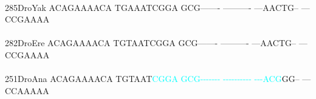 \documentclass[11pt,twoside,reqno,a4paper]{article}
\begin{document}
{\hspace*{4\charwidth}\hspace*{7\charwidth}\hspace*{1\charwidth}\hspace*{1\charwidth}\hspace*{1\charwidth}\hspace*{1\charwidth}\hspace*{1\charwidth}\hspace*{1\charwidth}\\
285\hspace*{1\charwidth}DroYak	ACAGAAAACA	TGAAATCGGA	GCG-------	----------	---AACTG--	---CCGAAAA	\\
\hspace*{4\charwidth}\hspace*{7\charwidth}\hspace*{1\charwidth}\hspace*{1\charwidth}\hspace*{1\charwidth}\hspace*{1\charwidth}\hspace*{1\charwidth}\hspace*{1\charwidth}\\
282\hspace*{1\charwidth}DroEre	ACAGAAAACA	TGTAATCGGA	GCG-------	----------	---AACTG--	---CCGAAAA	\\
\hspace*{4\charwidth}\hspace*{7\charwidth}\hspace*{1\charwidth}\hspace*{1\charwidth}\hspace*{1\charwidth}\hspace*{1\charwidth}\hspace*{1\charwidth}\hspace*{1\charwidth}\\
251\hspace*{1\charwidth}DroAna	ACAGAAAACA	TGTAAT\textcolor{cyan}{C}\textcolor{cyan}{G}\textcolor{cyan}{G}\textcolor{cyan}{A}	\textcolor{cyan}{G}\textcolor{cyan}{C}\textcolor{cyan}{G}\textcolor{cyan}{-}\textcolor{cyan}{-}\textcolor{cyan}{-}\textcolor{cyan}{-}\textcolor{cyan}{-}\textcolor{cyan}{-}\textcolor{cyan}{-}	\textcolor{cyan}{-}\textcolor{cyan}{-}\textcolor{cyan}{-}\textcolor{cyan}{-}\textcolor{cyan}{-}\textcolor{cyan}{-}\textcolor{cyan}{-}\textcolor{cyan}{-}\textcolor{cyan}{-}\textcolor{cyan}{-}	\textcolor{cyan}{-}\textcolor{cyan}{-}\textcolor{cyan}{-}\textcolor{cyan}{A}\textcolor{cyan}{C}\textcolor{cyan}{G}GG--	---CCAAAAA	\\
}
\end{document}
